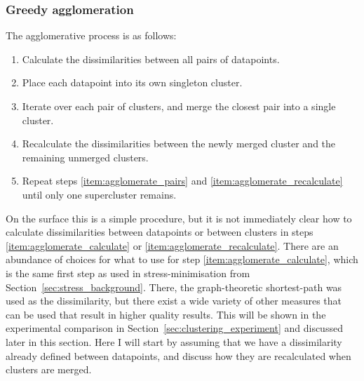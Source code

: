 \subsubsection{Greedy agglomeration}
The agglomerative process is as follows:
\begin{mdframed}[backgroundcolor=WhiteSmoke]
\begin{enumerate}[leftmargin=*]
    \item Calculate the dissimilarities between all pairs of datapoints. \label{item:agglomerate_calculate}
    \item Place each datapoint into its own singleton cluster.
    \item Iterate over each pair of clusters, and merge the closest pair into a single cluster. \label{item:agglomerate_pairs}
    \item Recalculate the dissimilarities between the newly merged cluster and the remaining unmerged clusters. \label{item:agglomerate_recalculate}
    \item Repeat steps \ref{item:agglomerate_pairs} and \ref{item:agglomerate_recalculate} until only one supercluster remains.
\end{enumerate}
\end{mdframed}
On the surface this is a simple procedure, but it is not immediately clear how to calculate dissimilarities between datapoints or between clusters in steps \ref{item:agglomerate_calculate} or \ref{item:agglomerate_recalculate}.
There are an abundance of choices for what to use for step \ref{item:agglomerate_calculate}, which is the same first step as used in stress-minimisation from Section~\ref{sec:stress_background}. There, the graph-theoretic shortest-path was used as the dissimilarity, but there exist a wide variety of other measures that can be used that result in higher quality results. This will be shown in the experimental comparison in Section~\ref{sec:clustering_experiment} and discussed later in this section. Here I will start by assuming that we have a dissimilarity already defined between datapoints, and discuss how they are recalculated when clusters are merged.

